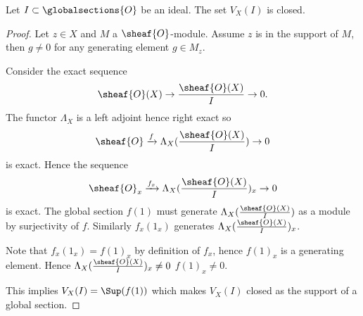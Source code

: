 \begin{lemma}
Let $I \subset \globalsections{O}$ be an ideal.
The set $V_X(I)$ is closed.
\end{lemma}

\begin{proof}
Let $z\in X$ and $M$ a $\sheaf{O}$-module. Assume $z$ is in the support of $M$, then $g\neq 0$ for any generating element $g\in M_z$. 

Consider the exact sequence 
\[\sheaf{O}(X)\rightarrow \frac{\sheaf{O}(X)}{I} \rightarrow 0.\]
The functor $\Lambda_X$ is a left adjoint hence right exact so 
\[\sheaf{O} \xrightarrow{f} \Lambda_X(\frac{\sheaf{O}(X)}{I}) \rightarrow 0\]
is exact.
Hence the sequence
\[\sheaf{O}_x \xrightarrow{f_x} \Lambda_X(\frac{\sheaf{O}(X)}{I})_x \rightarrow 0\]
is exact. 
The global section $f(1)$ must generate $\Lambda_X(\frac{\sheaf{O}(X)}{I})$ as a module by surjectivity of $f$.
Similarly $f_x(1_x)$ generates $\Lambda_X(\frac{\sheaf{O}(X)}{I})_x$.

Note that $f_x(1_x) = f(1)_x$ by definition of $f_x$, hence $f(1)_x$ is a generating element.
Hence $\Lambda_X(\frac{\sheaf{O}(X)}{I})_x \neq 0$ \iff $f(1)_x \neq 0$. 

This implies $V_X(I) = \Sup(f(1))$ which makes $V_X(I)$ closed as the support of a global section.
\end{proof}